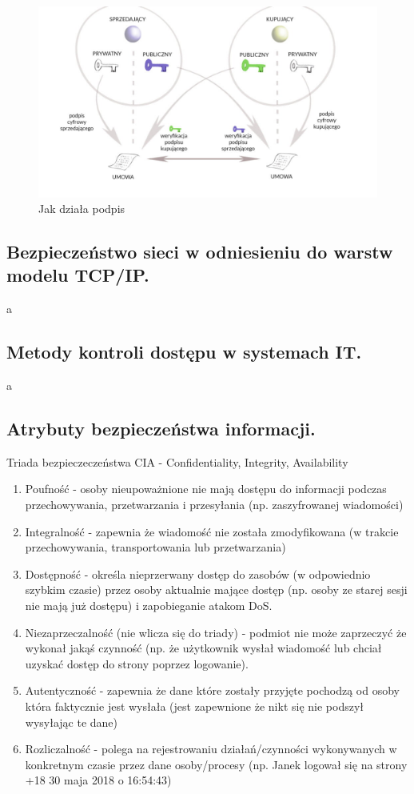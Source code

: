 \documentclass[a4paper,12pt,oneside]{book}
\begin{document}
				\begin{figure}[h]
					\centering\includegraphics[scale=0.35]{krypt_asym_podpis.png}
					\caption{Jak działa podpis}
				\end{figure}
				
			\newpage\subsection{\color{red}Bezpieczeństwo sieci w odniesieniu do warstw modelu TCP/IP.}
				a
			\newpage\subsection{\color{red}Metody kontroli dostępu w systemach IT.}
				a
			\newpage\subsection{Atrybuty bezpieczeństwa informacji.}
				Triada bezpieczeczeństwa CIA - Confidentiality, Integrity, Availability
				\begin{enumerate}
					\item Poufność - osoby nieupoważnione nie mają dostępu do informacji podczas
					przechowywania, przetwarzania i przesyłania (np. zaszyfrowanej wiadomości)
					\item Integralność - zapewnia że wiadomość nie została zmodyfikowana (w trakcie
					przechowywania, transportowania lub przetwarzania)
					\item Dostępność - określa nieprzerwany dostęp do zasobów (w odpowiednio szybkim
					czasie) przez osoby aktualnie mające dostęp (np. osoby ze starej sesji nie mają już
					dostępu) i zapobieganie atakom DoS.
					\item Niezaprzeczalność (nie wlicza się do triady) - podmiot nie może zaprzeczyć że
					wykonał jakąś czynność (np. że użytkownik wysłał wiadomość lub chciał uzyskać
					dostęp do strony poprzez logowanie).
					\item Autentyczność - zapewnia że dane które zostały przyjęte pochodzą od osoby która
					faktycznie jest wysłała (jest zapewnione że nikt się nie podszył wysyłając te dane)
					\item Rozliczalność - polega na rejestrowaniu działań/czynności wykonywanych w
					konkretnym czasie przez dane osoby/procesy (np. Janek logował się na strony +18
					30 maja 2018 o 16:54:43)
				\end{enumerate}
	
\end{document}
